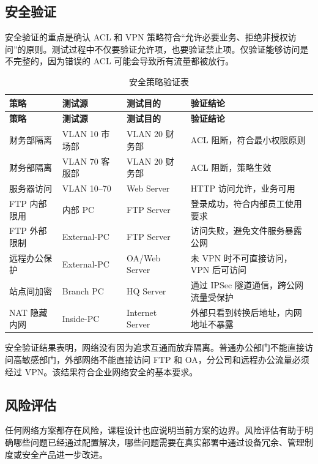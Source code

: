 \documentclass[12pt,a4paper]{ctexart}
\begin{document}
\subsection{安全验证}

安全验证的重点是确认 ACL 和 VPN 策略符合“允许必要业务、拒绝非授权访问”的原则。测试过程中不仅要验证允许项，也要验证禁止项。仅验证能够访问是不完整的，因为错误的 ACL 可能会导致所有流量都被放行。

\begin{longtable}{|p{3cm}|p{3.5cm}|p{3.5cm}|p{4cm}|}
\caption{安全策略验证表}
\label{tab:security-verify}\\
\hline
\textbf{策略} & \textbf{测试源} & \textbf{测试目的} & \textbf{验证结论} \\ \hline
\endfirsthead
\hline
\textbf{策略} & \textbf{测试源} & \textbf{测试目的} & \textbf{验证结论} \\ \hline
\endhead
财务部隔离 & VLAN 10 市场部 & VLAN 20 财务部 & ACL 阻断，符合最小权限原则 \\ \hline
财务部隔离 & VLAN 70 客服部 & VLAN 20 财务部 & ACL 阻断，策略生效 \\ \hline
服务器访问 & VLAN 10--70 & Web Server & HTTP 访问允许，业务可用 \\ \hline
FTP 内部限用 & 内部 PC & FTP Server & 登录成功，符合内部员工使用要求 \\ \hline
FTP 外部限制 & External-PC & FTP Server & 访问失败，避免文件服务暴露公网 \\ \hline
远程办公保护 & External-PC & OA/Web Server & 未 VPN 时不可直接访问，VPN 后可访问 \\ \hline
站点间加密 & Branch PC & HQ Server & 通过 IPSec 隧道通信，跨公网流量受保护 \\ \hline
NAT 隐藏内网 & Inside-PC & Internet Server & 外部只看到转换后地址，内网地址不暴露 \\ \hline
\end{longtable}

安全验证结果表明，网络没有因为追求互通而放弃隔离。普通办公部门不能直接访问高敏感部门，外部网络不能直接访问 FTP 和 OA，分公司和远程办公流量必须经过 VPN。该结果符合企业网络安全的基本要求。

\subsection{风险评估}

任何网络方案都存在风险，课程设计也应说明当前方案的边界。风险评估有助于明确哪些问题已经通过配置解决，哪些问题需要在真实部署中通过设备冗余、管理制度或安全产品进一步改进。
\end{document}
